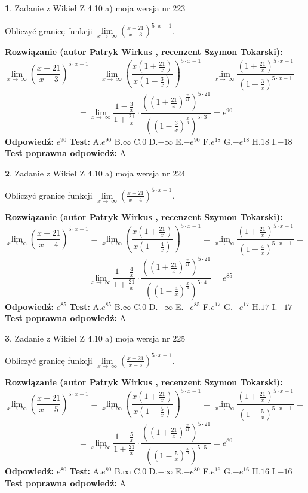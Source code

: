 \documentclass[12pt, a4paper]{article}
\theoremstyle{definition} %
\newtheorem{zad}{}
\newcommand{\zadStart}[1]{\begin{zad}#1\newline}
\newcommand{\zadStop}{\end{zad}}
\newcommand{\rozwStart}[2]{\noindent \textbf{Rozwiązanie (autor #1 , recenzent #2): }\newline}
\newcommand{\rozwStop}{\newline}
\newcommand{\odpStart}{\noindent \textbf{Odpowiedź:}\newline}
\newcommand{\odpStop}{\newline}
\newcommand{\testStart}{\noindent \textbf{Test:}\newline}
\newcommand{\testStop}{\newline}
\newcommand{\kluczStart}{\noindent \textbf{Test poprawna odpowiedź:}\newline}
\newcommand{\kluczStop}{\newline}
\begin{document}
\zadStart{Zadanie z Wikieł Z 4.10 a) moja wersja nr 223}

Obliczyć granicę funkcji  $\lim\limits_{x\to\ \infty}(\frac{x+21}{x-3})^{5\cdot x-1}$.
\zadStop
\rozwStart{Patryk Wirkus}{Szymon Tokarski}
$$\lim\limits_{x\to\ \infty}(\frac{x+21}{x-3})^{5\cdot x-1} = \lim\limits_{x\to\ \infty}(\frac{x(1+\frac{21}{x})}{x(1-\frac{3}{x})})^{5\cdot x-1}=\lim\limits_{x\to\ \infty}\frac{(1+\frac{21}{x})^{5\cdot x-1}}{(1-\frac{3}{x})^{5\cdot x-1}}=$$
$$=\lim\limits_{x\to\ \infty}\frac{1-\frac{3}{x}}{1+\frac{21}{x}}\cdot\frac{((1+\frac{21}{x})^{\frac{x}{21}})^{5\cdot21}}{((1-\frac{3}{x})^{\frac{x}{3}})^{5\cdot3}}=e^{90}$$
\rozwStop
\odpStart
$e^{90}$
\odpStop
\testStart
A.$e^{90}$ B.$\infty$ C.$0$ D.$-\infty$ E.$-e^{90}$
F.$e^{18}$ G.$-e^{18}$
H.$18$
I.$-18$
\testStop
\kluczStart
A
\kluczStop



\zadStart{Zadanie z Wikieł Z 4.10 a) moja wersja nr 224}

Obliczyć granicę funkcji  $\lim\limits_{x\to\ \infty}(\frac{x+21}{x-4})^{5\cdot x-1}$.
\zadStop
\rozwStart{Patryk Wirkus}{Szymon Tokarski}
$$\lim\limits_{x\to\ \infty}(\frac{x+21}{x-4})^{5\cdot x-1} = \lim\limits_{x\to\ \infty}(\frac{x(1+\frac{21}{x})}{x(1-\frac{4}{x})})^{5\cdot x-1}=\lim\limits_{x\to\ \infty}\frac{(1+\frac{21}{x})^{5\cdot x-1}}{(1-\frac{4}{x})^{5\cdot x-1}}=$$
$$=\lim\limits_{x\to\ \infty}\frac{1-\frac{4}{x}}{1+\frac{21}{x}}\cdot\frac{((1+\frac{21}{x})^{\frac{x}{21}})^{5\cdot21}}{((1-\frac{4}{x})^{\frac{x}{4}})^{5\cdot4}}=e^{85}$$
\rozwStop
\odpStart
$e^{85}$
\odpStop
\testStart
A.$e^{85}$ B.$\infty$ C.$0$ D.$-\infty$ E.$-e^{85}$
F.$e^{17}$ G.$-e^{17}$
H.$17$
I.$-17$
\testStop
\kluczStart
A
\kluczStop



\zadStart{Zadanie z Wikieł Z 4.10 a) moja wersja nr 225}

Obliczyć granicę funkcji  $\lim\limits_{x\to\ \infty}(\frac{x+21}{x-5})^{5\cdot x-1}$.
\zadStop
\rozwStart{Patryk Wirkus}{Szymon Tokarski}
$$\lim\limits_{x\to\ \infty}(\frac{x+21}{x-5})^{5\cdot x-1} = \lim\limits_{x\to\ \infty}(\frac{x(1+\frac{21}{x})}{x(1-\frac{5}{x})})^{5\cdot x-1}=\lim\limits_{x\to\ \infty}\frac{(1+\frac{21}{x})^{5\cdot x-1}}{(1-\frac{5}{x})^{5\cdot x-1}}=$$
$$=\lim\limits_{x\to\ \infty}\frac{1-\frac{5}{x}}{1+\frac{21}{x}}\cdot\frac{((1+\frac{21}{x})^{\frac{x}{21}})^{5\cdot21}}{((1-\frac{5}{x})^{\frac{x}{5}})^{5\cdot5}}=e^{80}$$
\rozwStop
\odpStart
$e^{80}$
\odpStop
\testStart
A.$e^{80}$ B.$\infty$ C.$0$ D.$-\infty$ E.$-e^{80}$
F.$e^{16}$ G.$-e^{16}$
H.$16$
I.$-16$
\testStop
\kluczStart
A
\kluczStop
\end{document}
